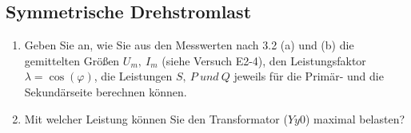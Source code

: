 \subsection{Symmetrische Drehstromlast }
\begin{enumerate}[label=\alph*)]
  \item Geben Sie an, wie Sie aus den Messwerten nach 3.2 (a) und (b) die gemittelten Größen $U_m,\ I_m$ (siehe Versuch E2-4), den Leistungsfaktor $\lambda=\cos(\varphi)$, die Leistungen $S,\ P\ und\ Q$ jeweils für die Primär- und die Sekundärseite berechnen können. 
  \item Mit welcher Leistung können Sie den Transformator ($Yy0$) maximal belasten?
\end{enumerate}
